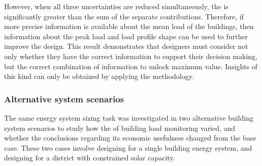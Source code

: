 However, when all three uncertainties are reduced simultaneously, the  is significantly greater than the sum of the separate contributions\footnotemark. Therefore, if more precise information is available about the mean load of the buildings, then information about the peak load and load profile shape can be used to further improve the design. This result demonstrates that designers must consider not only whether they have the correct information to support their decision making, but the correct combination of information to unlock maximum value. Insights of this kind can only be obtained by applying the  methodology.



\subsubsection{Alternative system scenarios} \label{sec:districts-alt-systems}


The same energy system sizing task was investigated in two alternative building system scenarios to study how the  of building load monitoring varied, and whether the conclusions regarding its economic usefulness changed from the base case. These two cases involve designing for a single building energy system, and designing for a district with constrained solar capacity.

